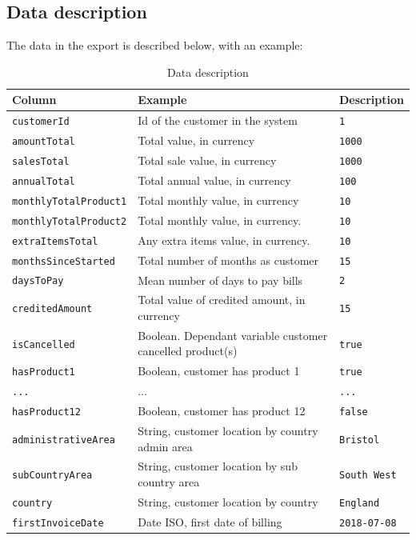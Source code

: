 \documentclass[runningheads]{llncs}
\begin{document}
\subsection{Data description}
The data in the export is described below, with an example:
\begin{table}
\caption{Data description}\label{tab1}
\begin{tabular}{|l|l|l|}
\hline
Column &  Example & Description\\
\hline
\texttt{customerId} &  Id of the customer in the system & \texttt{1}\\
\texttt{amountTotal} &  Total value, in currency & \texttt{1000}\\
\texttt{salesTotal} &  Total sale value, in currency & \texttt{1000}\\
\texttt{annualTotal} &  Total annual value, in currency & \texttt{100}\\
\texttt{monthlyTotalProduct1} & Total monthly value, in currency & \texttt{10}\\
\texttt{monthlyTotalProduct2} & Total monthly value, in currency. & \texttt{10}\\
\texttt{extraItemsTotal} & Any extra items value, in currency. & \texttt{10}\\
\texttt{monthsSinceStarted} & Total number of months as customer & \texttt{15}\\
\texttt{daysToPay} & Mean number of days to pay bills & \texttt{2}\\
\texttt{creditedAmount} & Total value of credited amount, in currency & \texttt{15}\\
\texttt{isCancelled} & Boolean. Dependant variable customer cancelled product(s) & \texttt{true}\\
\texttt{hasProduct1} & Boolean, customer has product 1 & \texttt{true}\\
\texttt{...} & ... & \texttt{...}\\
\texttt{hasProduct12} & Boolean, customer has product 12 & \texttt{false}\\
\texttt{administrativeArea} & String, customer location by country admin area & \texttt{Bristol}\\
\texttt{subCountryArea} & String, customer location by sub country area & \texttt{South West}\\
\texttt{country} & String, customer location by country & \texttt{England}\\
\texttt{firstInvoiceDate} & Date ISO, first date of billing & \texttt{2018-07-08}\\
\hline
\end{tabular}
\end{table}
\end{document}
